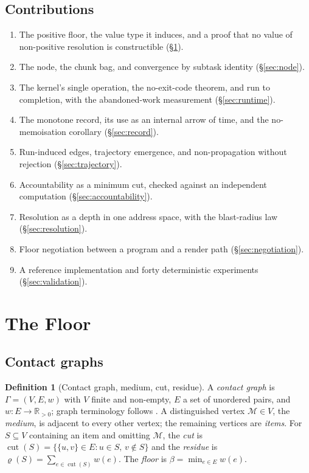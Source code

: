 \documentclass[11pt,twocolumn,a4paper]{article}
\theoremstyle{definition}
\newtheorem{definition}[theorem]{Definition}
\theoremstyle{remark}
\newcommand{\R}{\mathbb{R}}
\newcommand{\Rpos}{\R_{>0}}
\newcommand{\flo}{\beta}
\newcommand{\med}{\mathcal{M}}
\newcommand{\Gph}{\Gamma}
\newcommand{\cut}{\operatorname{cut}}
\newcommand{\wt}{w}
\newcommand{\res}{\varrho}
\begin{document}
\subsection{Contributions}

\begin{enumerate}[label=(\roman*),leftmargin=2.2em]
\item The positive floor, the value type it induces, and a proof that no value of
  non-positive resolution is constructible (\S\ref{sec:floor}).
\item The node, the chunk bag, and convergence by subtask identity
  (\S\ref{sec:node}).
\item The kernel's single operation, the no-exit-code theorem, and run to
  completion, with the abandoned-work measurement (\S\ref{sec:runtime}).
\item The monotone record, its use as an internal arrow of time, and the
  no-memoisation corollary (\S\ref{sec:record}).
\item Run-induced edges, trajectory emergence, and non-propagation without
  rejection (\S\ref{sec:trajectory}).
\item Accountability as a minimum cut, checked against an independent
  computation (\S\ref{sec:accountability}).
\item Resolution as a depth in one address space, with the blast-radius law
  (\S\ref{sec:resolution}).
\item Floor negotiation between a program and a render path
  (\S\ref{sec:negotiation}).
\item A reference implementation and forty deterministic experiments
  (\S\ref{sec:validation}).
\end{enumerate}

\section{The Floor}
\label{sec:floor}

\subsection{Contact graphs}

\begin{definition}[Contact graph, medium, cut, residue]
\label{def:substrate}
A \emph{contact graph} is $\Gph=(V,E,\wt)$ with $V$ finite and non-empty, $E$ a
set of unordered pairs, and $\wt\colon E\to\Rpos$; graph terminology follows
\citet{diestel2010graph}. A distinguished vertex $\med\in V$, the \emph{medium},
is adjacent to every other vertex; the remaining vertices are \emph{items}. For
$S\subseteq V$ containing an item and omitting $\med$, the \emph{cut} is
$\cut(S)=\{\{u,v\}\in E: u\in S,\, v\notin S\}$ and the \emph{residue} is
$\res(S)=\sum_{e\in\cut(S)}\wt(e)$. The \emph{floor} is
$\flo=\min_{e\in E}\wt(e)$.
\end{definition}
\end{document}
